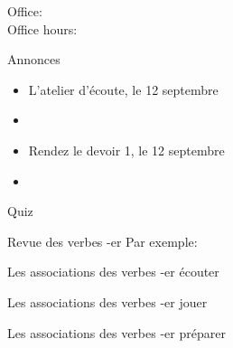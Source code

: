 \documentclass{beamer}
\subtitle[Activités]{Nos activités}
\begin{document}
  \begin{frame}
    \titlepage
    \tiny{Office: \\
          Office hours: }
  \end{frame}

  \begin{frame}{Annonces}
    \begin{itemize}
      \item L'atelier d'écoute, le 12 septembre
      \item[] 
      \item Rendez le devoir 1, le 12 septembre
      \item[] 
    \end{itemize}
  \end{frame}

  \begin{frame}{}
    \begin{center}
      \Large Quiz
    \end{center}
  \end{frame}

  \begin{frame}{Revue des verbes -er}
    Par exemple:
    \begin{center}
      
    \end{center}
  \end{frame}

  \begin{frame}{Les associations des verbes -er}
    \centering
    écouter

  \end{frame}

  \begin{frame}{Les associations des verbes -er}
    \centering
    jouer

  \end{frame}

  \begin{frame}{Les associations des verbes -er}
    \centering
    préparer

  \end{frame}
\end{document}
